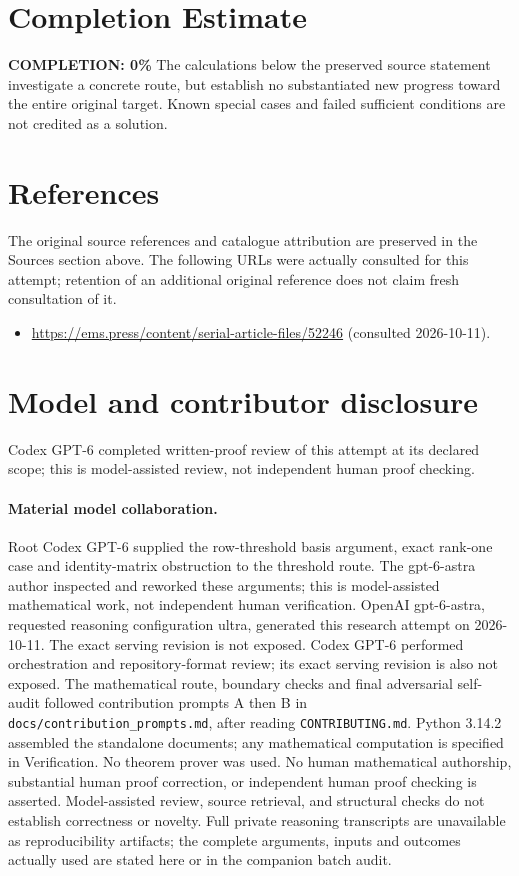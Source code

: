\documentclass[11pt]{article}
\begin{document}
\section{Completion Estimate}
\noindent\textbf{COMPLETION: 0\%}
The calculations below the preserved source statement investigate a concrete route,
but establish no substantiated new progress toward the entire original target.
Known special cases and failed sufficient conditions are not credited as a solution.
\section{References}
The original source references and catalogue attribution are preserved in the
Sources section above. The following URLs were actually consulted for this attempt;
retention of an additional original reference does not claim fresh consultation of it.
\begin{itemize}
\item \url{https://ems.press/content/serial-article-files/52246} (consulted 2026-10-11). 
\end{itemize}
\section{Model and contributor disclosure}
Codex GPT-6 completed written-proof review of this attempt at its declared scope; this is model-assisted review, not independent human proof checking.
\paragraph{Material model collaboration.} Root Codex GPT-6 supplied the row-threshold basis argument, exact rank-one case and identity-matrix obstruction to the threshold route. The gpt-6-astra author inspected and reworked these arguments; this is model-assisted mathematical work, not independent human verification.
OpenAI gpt-6-astra, requested reasoning configuration ultra, generated this research
attempt on 2026-10-11. The exact serving revision is not exposed. Codex GPT-6
performed orchestration and repository-format review; its exact serving revision
is also not exposed. The mathematical route, boundary checks and final adversarial
self-audit followed contribution prompts A then B in
\texttt{docs/contribution\_prompts.md}, after reading \texttt{CONTRIBUTING.md}.
Python 3.14.2 assembled the standalone documents; any mathematical computation is
specified in Verification. No theorem prover was used. No human mathematical
authorship, substantial human proof correction, or independent human proof checking
is asserted. Model-assisted review, source retrieval, and structural checks do not
establish correctness or novelty. Full private reasoning transcripts are unavailable
as reproducibility artifacts; the complete arguments, inputs and outcomes actually
used are stated here or in the companion batch audit.
\end{document}
